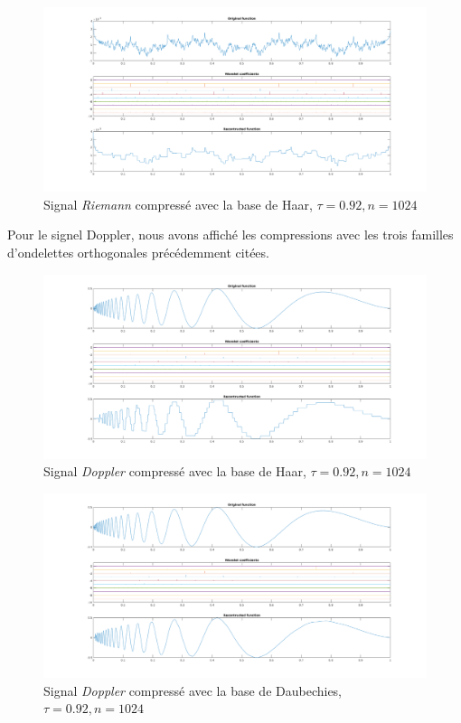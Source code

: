 \documentclass[a4paper,12pt, openany]{book}
\theoremstyle{break}
\begin{document}
\begin{figure}[H]
  \includegraphics[width=\textwidth]{Riemann_compression_0_92Haar}
  \caption{Signal \textit{Riemann} compressé avec la base de Haar, $\tau=0.92, n=1024$}
\end{figure}

Pour le signel Doppler, nous avons affiché les compressions avec les trois familles d'ondelettes orthogonales précédemment citées.
\begin{figure}[H]
  \includegraphics[width=\textwidth]{Doppler_compression_0_92Haar}
  \caption{Signal \textit{Doppler} compressé avec la base de Haar, $\tau=0.92, n=1024$}
\end{figure}

\begin{figure}[H]
  \includegraphics[width=\textwidth]{Doppler_compression_0_92Daubechies}
  \caption{Signal \textit{Doppler} compressé avec la base de Daubechies, $\tau=0.92, n=1024$}
\end{figure}
\end{document}
